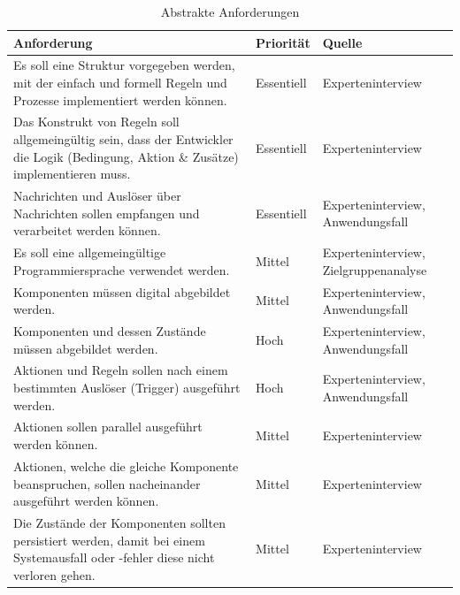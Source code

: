     \begin{table}[hbt!]
        \begin{center}
            \begin{tabular}{| p{10.4cm} | p{1.8cm} | p{3.2cm} | }
                \hline
                   \textbf{Anforderung} & \textbf{Priorität} & \textbf{Quelle} \\
                \hline
                    Es soll eine Struktur vorgegeben werden, mit der einfach und formell Regeln und Prozesse implementiert werden können. & Essentiell & Experteninterview \\ 
                \hline
                    Das Konstrukt von Regeln soll allgemeingültig sein, dass der Entwickler die Logik (Bedingung, Aktion \& Zusätze) implementieren muss. & Essentiell & Experteninterview \\
                \hline
                    Nachrichten und Auslöser über Nachrichten sollen empfangen und verarbeitet werden können. & Essentiell & Experteninterview, Anwendungsfall \\
                \hline
                    Es soll eine allgemeingültige Programmiersprache verwendet werden. & Mittel & Experteninterview, Zielgruppenanalyse \\ 
                \hline
                    Komponenten müssen digital abgebildet werden. & Mittel & Experteninterview, Anwendungsfall \\ 
                \hline
                    Komponenten und dessen Zustände müssen abgebildet werden. & Hoch & Experteninterview, Anwendungsfall \\ 
                \hline
                    Aktionen und Regeln sollen nach einem bestimmten Auslöser (Trigger) ausgeführt werden. & Hoch & Experteninterview, Anwendungsfall \\
                \hline
                    Aktionen sollen parallel ausgeführt werden können. & Mittel & Experteninterview \\ 
                \hline
                    Aktionen, welche die gleiche Komponente beanspruchen, sollen nacheinander ausgeführt werden können. & Mittel & Experteninterview \\
                \hline
                    Die Zustände der Komponenten sollten persistiert werden, damit bei einem Systemausfall oder -fehler diese nicht verloren gehen. & Mittel & Experteninterview \\ 
                \hline 
            \end{tabular}
        \end{center}
        \caption{Abstrakte Anforderungen}
        \label{tab:abstractRequirements}
    \end{table} 
